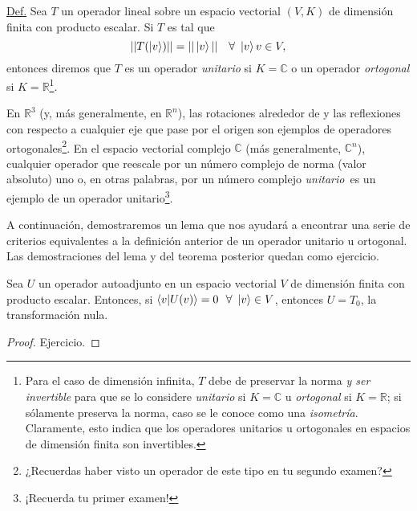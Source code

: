 \documentclass[12pt,dvipsnames]{article}
\newenvironment{lema}[2][Lema]{\begin{trivlist}
\item[\hskip \labelsep {\bfseries #1}\hskip \labelsep {\bfseries #2.}]}{\end{trivlist}}
\begin{document}
\begin{tcolorbox}
\underline{Def.} Sea $T$ un operador lineal sobre un espacio vectorial $(V,K)$ de dimensión finita con producto escalar. Si $T$ es tal que \[
    ||T(\ket{v})|| = ||\ket{v}|| \ \ \ \forall \ \ket{v}v\in V,
\] entonces diremos que $T$ es un operador \emph{unitario} si $K=\mathbb{C}$ o un operador \emph{ortogonal} si $K=\mathbb{R}$\footnote{Para el caso de dimensión infinita, $T$ debe de preservar la norma \emph{y ser invertible} para que se lo considere \emph{unitario} si $K=\mathbb{C}$ u \emph{ortogonal} si $K=\mathbb{R}$; si sólamente preserva la norma, caso se le conoce como una \emph{isometría}. Claramente, esto indica que los operadores unitarios u ortogonales en espacios de dimensión finita son invertibles.}.
\end{tcolorbox}

En $\mathbb{R}^3$ (y, más generalmente, en $\mathbb{R}^n$), las rotaciones alrededor de y las reflexiones con respecto a cualquier eje que pase por el origen son ejemplos de operadores ortogonales\footnote{¿Recuerdas haber visto un operador de este tipo en tu segundo examen?}. En el espacio vectorial complejo $\mathbb{C}$ (más generalmente, $\mathbb{C}^n$), cualquier operador que reescale por un número complejo de norma (valor absoluto) uno \textemdash o, en otras palabras, por un número complejo \emph{unitario}\textemdash \ es un ejemplo de un operador unitario\footnote{¡Recuerda tu primer examen!}.

\vspace{3mm}
A continuación, demostraremos un lema que nos ayudará a encontrar una serie de criterios equivalentes a la definición anterior de un operador unitario u ortogonal. Las demostraciones del lema y del teorema posterior quedan como ejercicio.

\begin{lema} {16.1}
    Sea $U$ un operador autoadjunto en un espacio vectorial $V$ de dimensión finita con producto escalar. Entonces, si $\braket{v|U(v)}=0 \ \ \forall \ \ket{v}\in V$, entonces $U=T_0$, la transformación nula. 
\end{lema}

\begin{proof}
    Ejercicio.
\end{proof}
\end{document}
